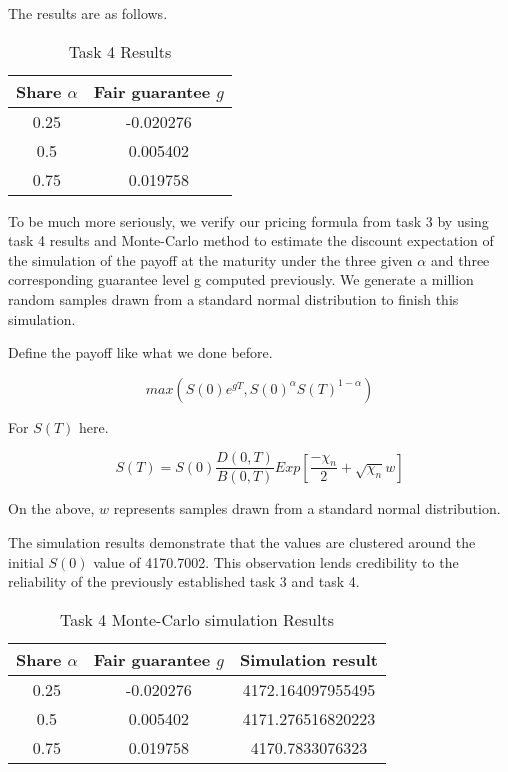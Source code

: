 The results are as follows.
\begin{table}[h]
    \centering
        \caption{Task 4 Results}
    \label{tab:task4_results}
    \begin{tabular}{|c|c|}
        \hline
        Share $\alpha$& Fair guarantee $g$\\
        \hline
        0.25 & -0.020276\\
        0.5 & 0.005402\\
        0.75 & 0.019758\\
        \hline
    \end{tabular}

\end{table}

To be much more seriously, we verify our pricing formula from task 3 by using task 4 results and Monte-Carlo method to estimate the discount expectation of the simulation of the payoff at the maturity under the  three given $\alpha$ and three corresponding guarantee level g computed previously. We generate a million random samples drawn from a standard normal distribution to finish this simulation. 

Define the payoff like what we done before.

\[max(S(0)e^{gT},S(0)^\alpha S(T)^{1-\alpha})\]

For $S(T)$ here.

\[S(T)=S(0)\frac{D(0,T)}{B(0,T)}Exp\left[\frac{-\chi_{n}}{2}+\sqrt{\chi_{n}}w\right]\]

On the above, $w$ represents samples drawn from a standard normal distribution.

The simulation results demonstrate that the values are clustered around the initial $S(0)$ value of 4170.7002. This observation lends credibility to the reliability of the previously established task 3 and task 4.

\begin{table}[h]
    \centering
        \caption{Task 4 Monte-Carlo simulation Results}
    \label{tab:task4_Monte_Carlo}
    \begin{tabular}{|c|c|c|}
        \hline
        Share $\alpha$& Fair guarantee $g$ & Simulation result\\
        \hline
        0.25 & -0.020276&4172.164097955495\\
        0.5 & 0.005402&4171.276516820223\\
        0.75 & 0.019758&4170.7833076323\\
        \hline
    \end{tabular}

\end{table}

